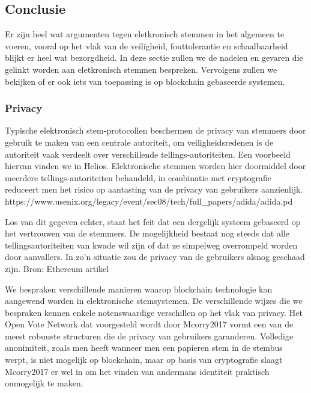 	\subsection{Conclusie} 
		Er zijn heel wat argumenten tegen eletkronisch stemmen in het algemeen te voeren, vooral op het vlak van de veiligheid, fouttolerantie en schaalbaarheid blijkt er heel wat bezorgdheid. In deze sectie zullen we de nadelen en gevaren die gelinkt worden aan eletkronisch stemmen bespreken. Vervolgens zullen we bekijken of er ook iets van toepassing is op blockchain gebaseerde systemen.
		
		\subsubsection{Privacy}
		Typische elektronisch stem-protocollen beschermen de privacy van stemmers door gebruik te maken van een centrale autoriteit, om veiligheidsredenen is de autoriteit vaak verdeelt over verschillende tellings-autoriteiten. Een voorbeeld hiervan vinden we in Helios. Elektronische stemmen worden hier doormiddel door meerdere tellings-autoriteiten behandeld, in combinatie met cryptografie reduceert men het risico op aantasting van de privacy van gebruikers aanzienlijk. https://www.usenix.org/legacy/event/sec08/tech/full_papers/adida/adida.pd
		
		Los van dit gegeven echter, staat het feit dat een dergelijk systeem gebaseerd op het vertrouwen van de stemmers. De mogelijkheid bestaat nog steeds dat alle tellingsautoriteiten van kwade wil zijn of dat ze simpelweg overrompeld worden door aanvallers. In zo’n situatie zou de privacy van de gebruikers alsnog geschaad zijn.  Bron: Ethereum artikel
		
		We bespraken verschillende manieren waarop blockchain technologie kan aangewend worden in elektronische stemsystemen. De verschillende wijzes die we bespraken kennen enkele notenswaardige verschillen op het vlak van privacy. Het Open Vote Network dat voorgesteld wordt door Mcorry2017 vormt een van de meest robuuste structuren die de privacy van gebruikers garanderen. Volledige anonimiteit, zoals men heeft wanneer men een papieren stem in de stembus werpt, is niet mogelijk op blockchain, maar op basis van cryptografie slaagt Mcorry2017 er wel in om het vinden van andermans identiteit praktisch onmogelijk te maken. 
		

